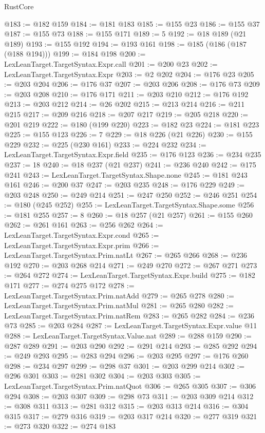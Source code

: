\begin{lexlean}{RustCore}
\begin{coremodule}
@183 := @182 @159
@184 := @181 @183
@185 := @155 @23
@186 := @155 @37
@187 := @155 @73
@188 := @155 @171
@189 := 5
@192 := @18 @189 (@21 @189)
@193 := @155 @192
@194 := @193 @161
@198 := @185 (@186 (@187 (@188 @194)))
@199 := @184 @198
@200 := LexLeanTarget.TargetSyntax.Expr.call
@201 := @200 @23
@202 := LexLeanTarget.TargetSyntax.Expr
@203 := @2 @202
@204 := @176 @23
@205 := @203 @204
@206 := @176 @37
@207 := @203 @206
@208 := @176 @73
@209 := @203 @208
@210 := @176 @171
@211 := @203 @210
@212 := @176 @192
@213 := @203 @212
@214 := @26 @202
@215 := @213 @214
@216 := @211 @215
@217 := @209 @216
@218 := @207 @217
@219 := @205 @218
@220 := @201 @219
@222 := @180 (@199 @220)
@223 := @182 @23
@224 := @181 @223
@225 := @155 @123
@226 := 7
@229 := @18 @226 (@21 @226)
@230 := @155 @229
@232 := @225 (@230 @161)
@233 := @224 @232
@234 := LexLeanTarget.TargetSyntax.Expr.field
@235 := @176 @123
@236 := @234 @235
@237 := 18
@240 := @18 @237 (@21 @237)
@241 := @236 @240
@242 := @175 @241
@243 := LexLeanTarget.TargetSyntax.Shape.none
@245 := @181 @243 @161
@246 := @200 @37
@247 := @203 @235
@248 := @176 @229
@249 := @203 @248
@250 := @249 @214
@251 := @247 @250
@252 := @246 @251
@254 := @180 (@245 @252)
@255 := LexLeanTarget.TargetSyntax.Shape.some
@256 := @181 @255
@257 := 8
@260 := @18 @257 (@21 @257)
@261 := @155 @260
@262 := @261 @161
@263 := @256 @262
@264 := LexLeanTarget.TargetSyntax.Expr.cond
@265 := LexLeanTarget.TargetSyntax.Expr.prim
@266 := LexLeanTarget.TargetSyntax.Prim.natLt
@267 := @265 @266
@268 := @236 @192
@270 := @203 @268 @214
@271 := @249 @270
@272 := @267 @271
@273 := @264 @272
@274 := LexLeanTarget.TargetSyntax.Expr.build
@275 := @182 @171
@277 := @274 @275 @172
@278 := LexLeanTarget.TargetSyntax.Prim.natAdd
@279 := @265 @278
@280 := LexLeanTarget.TargetSyntax.Prim.natMul
@281 := @265 @280
@282 := LexLeanTarget.TargetSyntax.Prim.natRem
@283 := @265 @282
@284 := @236 @73
@285 := @203 @284
@287 := LexLeanTarget.TargetSyntax.Expr.value @11
@288 := LexLeanTarget.TargetSyntax.Value.nat
@289 := @288 @159
@290 := @287 @289
@291 := @203 @290
@292 := @291 @214
@293 := @285 @292
@294 := @249 @293
@295 := @283 @294
@296 := @203 @295
@297 := @176 @260
@298 := @234 @297
@299 := @298 @37
@301 := @203 @299 @214
@302 := @296 @301
@303 := @281 @302
@304 := @203 @303
@305 := LexLeanTarget.TargetSyntax.Prim.natQuot
@306 := @265 @305
@307 := @306 @294
@308 := @203 @307
@309 := @298 @73
@311 := @203 @309 @214
@312 := @308 @311
@313 := @281 @312
@315 := @203 @313 @214
@316 := @304 @315
@317 := @279 @316
@319 := @203 @317 @214
@320 := @277 @319
@321 := @273 @320
@322 := @274 @183

\end{coremodule}
\end{lexlean}
